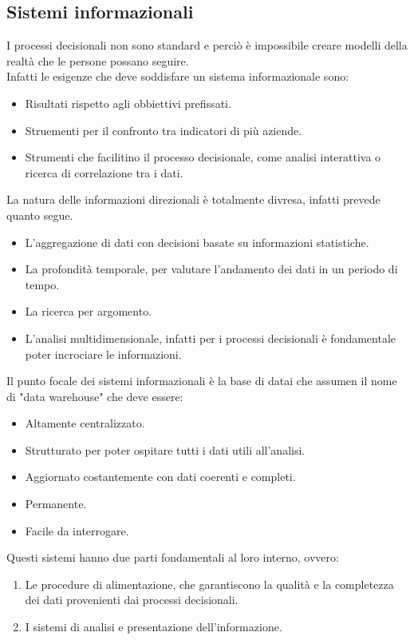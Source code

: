 \documentclass[../main.tex]{subfiles}
\begin{document}
	\subsection{Sistemi informazionali}
	I processi decisionali non sono standard e perciò è impossibile creare modelli della realtà che le persone possano seguire.\\
	Infatti le esigenze che deve soddisfare un sistema informazionale sono:
	\begin{itemize}
		\item Risultati rispetto agli obbiettivi prefissati.
		\item Struementi per il confronto tra indicatori di più aziende.
		\item Strumenti che facilitino il processo decisionale, come analisi interattiva o ricerca di correlazione tra i dati.
	\end{itemize}
	La natura delle informazioni direzionali è totalmente divresa, infatti prevede quanto segue.
	\begin{itemize}
		\item L'aggregazione di dati con decisioni basate su informazioni statistiche.
		\item La profondità temporale, per valutare l'andamento dei dati in un periodo di tempo.
		\item La ricerca per argomento.
		\item L'analisi multidimensionale, infatti per i processi decisionali è fondamentale poter incrociare le informazioni.
	\end{itemize}
	Il punto focale dei sistemi informazionali è la base di datai che assumen il nome di "data warehouse" che deve essere:
	\begin{itemize}
		\item Altamente centralizzato.
		\item Strutturato per poter ospitare tutti i dati utili all'analisi.
		\item Aggiornato costantemente con dati coerenti e completi.
		\item Permanente.
		\item Facile da interrogare.
	\end{itemize}
	Questi sistemi hanno due parti fondamentali al loro interno, ovvero:
	\begin{enumerate}
		\item Le procedure di alimentazione, che garantiscono la qualità e la completezza dei dati provenienti dai processi decisionali.
		\item I sistemi di analisi e presentazione dell'informazione.
	\end{enumerate}
\end{document}
